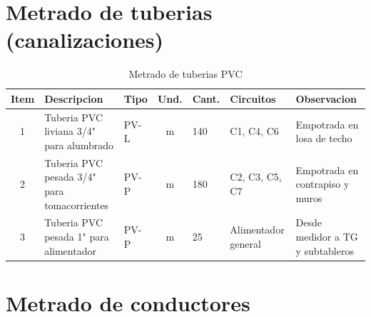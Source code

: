 \section{Metrado de tuberias (canalizaciones)}

\begin{landscape}
\begin{table}[H]
\centering
\small
\caption{Metrado de tuberias PVC}
\label{tab:metrado-tuberias}
\begin{tabularx}{\textwidth}{c L{4.5cm} L{1.5cm} c L{1.8cm} L{3.5cm} Y}
\toprule
\textbf{Item} & \textbf{Descripcion} & \textbf{Tipo} & \textbf{Und.} & \textbf{Cant.} & \textbf{Circuitos} & \textbf{Observacion} \\
 & Tuberia PVC liviana 3/4" para alumbrado & PV-L & m & 140 & C1, C4, C6 & Empotrada en losa de techo \\
2 & Tuberia PVC pesada 3/4" para tomacorrientes & PV-P & m & 180 & C2, C3, C5, C7 & Empotrada en contrapiso y muros \\
3 & Tuberia PVC pesada 1" para alimentador & PV-P & m & 25 & Alimentador general & Desde medidor a TG y subtableros \\
\bottomrule
\end{tabularx}
\end{table}
\end{landscape}

\section{Metrado de conductores}

